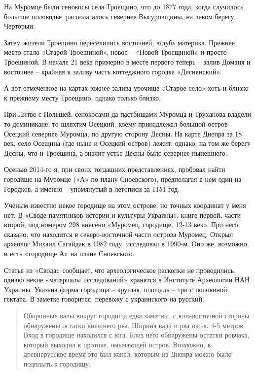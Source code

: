 На Муромце были сенокосы села Троещино, что до 1877 года, когда случилось большое половодье, располагалось севернее Выгуровщины, на левом берегу Черторыи.

Затем жители Троещино переселились восточней, вглубь материка. Прежнее место стало «Старой Троещиной», новое – «Новой Троещиной» и просто Троещиной. В начале 21 века примерно в месте первого теперь – залив Доманя и восточнее – крайняя к заливу часть коттеджного городка «Деснянский».

А вот отмеченное на картах южнее залива урочище «Старое село» хоть и близко к прежнему месту Троещино, однако только близко.

При Литве с Польшей, сенокосами да пастбищами Муромца и Труханова владели то доминикане, то шляхтич Осецкий, коему принадлежал большой остров Осецкий севернее Муромца, по другую сторону Десны. На карте Днепра за 18 век, село Осещина (где ныне и Осецкий остров) лежит, однако, на том же берегу Десны, что и Троещина, а значит устье Десны было севернее нынешнего.

Осенью 2014-го я, при своих тогдашних представлениях, пробовал найти городище на Муромце («А» по плану Сноевского), предполагая в нем один из Городков, а именно – упомянутый в летописи за 1151 год.

Ученым известно некое городище на этом острове, но точных координат у меня нет. В «Своде памятников истории и культуры Украины», книге первой, части второй, под номером 298 внесено «Муромец, городище, 12-13 век». Про него сказано, что находится в северо-восточной части острова Муромец. Открыл археолог Михаил Сагайдак в 1982 году, исследовал в 1990-м. Оно же, возможно, и есть «городище А» на плане Сноевского.

Статья из «Свода» сообщает, что археологическое раскопки не проводились, однако некие «материалы исследований» хранятся в Институте Археологии НАН Украины. Указана форма городища – круглая, площадь – три с половиной гектара. В заметке говорится, перевожу с украинского на русский:

\begin{quotation}
Оборонные валы вокруг городища едва заметны, с юго-восточной стороны обнаружены остатки внешнего рва. Ширина вала и рва около 4-5 метров. Вход в городище находился с юга. Близ него обнаружены остатки ровчака, который выходил к протоке, омывающей остров. Возможно, в древнерусское время это был канал, которым из Днепра можно было подплыть к городищу.
\end{quotation}

